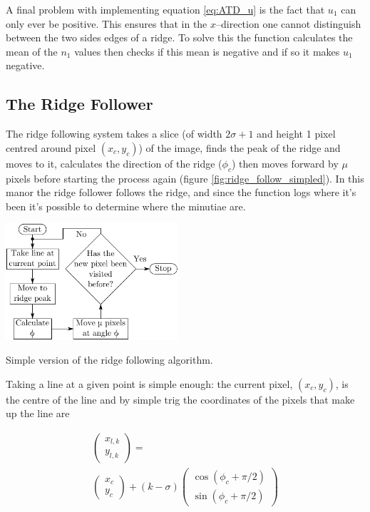 \documentclass[11pt,a4paper]{article}
\makeatletter
\newenvironment{figurehere}
    {\def\@captype{figure}}
    {}
\makeatother
\begin{document}
\begin{multicols}{2}
		A final problem with implementing equation \eqref{eq:ATD_u} is the fact that $u_1$ can only ever be positive. This ensures that in the $x$--direction one cannot distinguish between the two sides edges of a ridge. To solve this the function calculates the mean of the $n_1$ values then checks if this mean is negative and if so it makes $u_1$ negative.

	\subsection{The Ridge Follower}
		The ridge following system takes a slice (of width $2 \sigma + 1$ and height 1 pixel centred around pixel $(x_c, y_c)$) of the image, finds the peak of the ridge and moves to it, calculates the direction of the ridge ($\phi_c$) then moves forward by $\mu$ pixels before starting the process again (figure \ref{fig:ridge_follow_simpled}). In this manor the ridge follower follows the ridge, and since the function logs where it's been it's possible to determine where the minutiae are.

\begin{figurehere}
\centering
\includegraphics[width = 0.48\textwidth]{ridge_follow_simpled}
\caption{Simple version of the ridge following algorithm.}
\label{fig:ridge_follow_simpled}
\end{figurehere}

		Taking a line at a given point is simple enough: the current pixel, $(x_c, y_c)$, is the centre of the line and by simple trig the coordinates of the pixels that make up the line are

		\begin{equation}
		\begin{split}
			\begin{pmatrix}
			x_{l,k} \\
			y_{l,k}
			\end{pmatrix}
			= \\
			\begin{pmatrix}
			x_c \\
			y_c
			\end{pmatrix}
			+ (k - \sigma)
			\begin{pmatrix}
			\cos{(\phi_c + \pi/2)} \\
			\sin{(\phi_c + \pi/2)}
			\end{pmatrix}
		\end{split}
		\end{equation}


\end{multicols}
\end{document}
